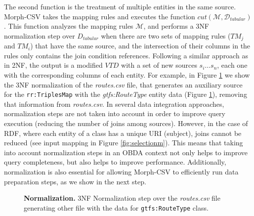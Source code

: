 The second function is the treatment of multiple entities in the same source. Morph-CSV takes the mapping rules and executes the function $cut(\mathcal{M},\mathcal{D}_{tabular})$. This function analyzes the mapping rules $\mathcal{M}$, and performs a 3NF~\citep{codd1979extending} normalization step over ${D}_{tabular}$ when there are two sets of mapping rules ($TM_j$ and $TM_i$) that have the same source, and the intersection of their columns in the rules only contains the join condition references. Following a similar approach as in 2NF, the output is a modified $VTD$ with a set of new sources $s_i\ldots s_n$, each one with the corresponding columns of each entity. For example, in Figure \ref{fig:normalization} we show the 3NF normalization of the \textit{routes.csv} file, that generates an auxiliary source for the \texttt{rr:TriplesMap} with the \textit{gtfs:RouteType} entity data (Figure \ref{fig:normalization}), removing that information from \textit{routes.csv}. In several data integration approaches, normalization steps are not taken into account in order to improve query execution (reducing the number of joins among sources). However, in the case of RDF, where each entity of a class has a unique URI (subject), joins cannot be reduced (see input mapping in Figure \ref{fig:selectionm}). This means that taking into account normalization steps in an OBDA context not only helps to improve query completeness, but also helps to improve performance. Additionally, normalization is also essential for allowing Morph-CSV to efficiently run data preparation steps, as we show in the next step.

\begin{figure}[th]
\centering
{}
\caption[Normalization step]{\textbf{Normalization.} 3NF Normalization step over the \textit{routes.csv} file generating other file with the data for \texttt{gtfs:RouteType} class.}
\label{fig:normalization}
\end{figure}

